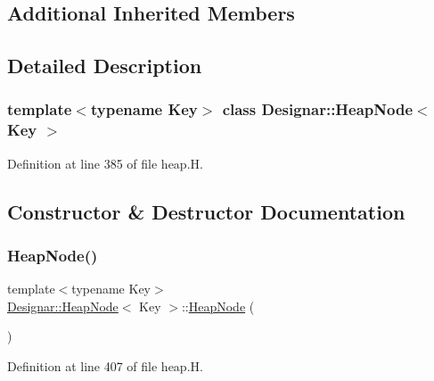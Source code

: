 \subsection*{Additional Inherited Members}


\subsection{Detailed Description}
\subsubsection*{template$<$typename Key$>$\newline
class Designar\+::\+Heap\+Node$<$ Key $>$}



Definition at line 385 of file heap.\+H.



\subsection{Constructor \& Destructor Documentation}
\mbox{\label{class_designar_1_1_heap_node_ae38c08903f2c52e19c71d392661893f2}} 
\subsubsection{\texorpdfstring{Heap\+Node()}{HeapNode()}\hspace{0.1cm}{\footnotesize\ttfamily [1/4]}}
{\footnotesize\ttfamily template$<$typename Key$>$ \\
\hyperlink{class_designar_1_1_heap_node}{Designar\+::\+Heap\+Node}$<$ Key $>$\+::\hyperlink{class_designar_1_1_heap_node}{Heap\+Node} (\begin{DoxyParamCaption}{ }\end{DoxyParamCaption})\hspace{0.3cm}{\ttfamily [inline]}}



Definition at line 407 of file heap.\+H.

\mbox{\label{class_designar_1_1_heap_node_ac5b4c9acb233f72e70b0dc3f4a46e3b5}} 

